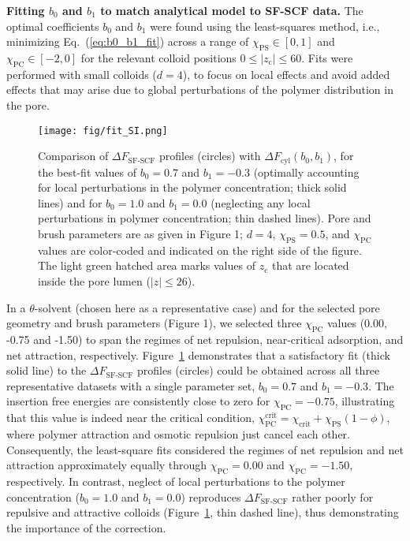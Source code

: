 \documentclass[10pt, a4paper, twocolumn]{article}
\begin{document}
\bigskip\noindent
\textbf{Fitting $b_0$ and $b_1$ to match analytical model to SF-SCF data.}
The optimal coefficients $b_0$ and $b_1$ were found using the least-squares method, i.e., minimizing Eq.~(\ref{eq:b0_b1_fit}) across a range of $\chi_{\text{PS}} \in [0,1]$  and $\chi_{\text{PC}} \in [-2,0]$ for the relevant colloid positions $0 \leq |z_{\text{c}}| \leq 60$.
Fits were performed with small colloids ($d=4$), to focus on local effects and avoid added effects that may arise due to global perturbations of the polymer distribution in the pore.

\begin{figure}[]
    \centering
    \texttt{[image: fig/fit\_SI.png]}
    \caption{
    Comparison of $\Delta F_{\text{SF-SCF}}$ profiles (circles) with $\Delta F_{\text{cyl}}(b_0,b_1)$, for the best-fit values of $b_0 = 0.7$ and $b_1 = -0.3$ (optimally accounting for local perturbations in the polymer concentration; thick solid lines) and for $b_0 = 1.0$ and $b_1 = 0.0$ (neglecting any local perturbations in polymer concentration; thin dashed lines).
    Pore and brush parameters are as given in Figure 1; $d = 4$, $\chi_{\text{PS}} = 0.5$, and $\chi_{\text{PC}}$ values are color-coded and indicated on the right side of the figure.
    The light green hatched area marks values of $z_{\text{c}}$ that are located inside the pore lumen ($|z| \leq 26$).
    }
    \label{fig:fit_SI}
\end{figure}

In a $\theta$-solvent (chosen here as a representative case) and for the selected pore geometry and brush parameters (Figure 1), we selected three $\chi_{\text{PC}}$ values (0.00, -0.75 and -1.50) to span the regimes of net repulsion, near-critical adsorption, and net attraction, respectively.
Figure~\ref{fig:fit_SI} demonstrates that a satisfactory fit (thick solid line) to the $\Delta F_{\text{SF-SCF}}$ profiles (circles) could be obtained across all three representative datasets with a single parameter set, $b_0 = 0.7$ and $b_1 = -0.3$.
The insertion free energies are consistently close to zero for $\chi_{\text{PC}} = -0.75$, illustrating that this value is indeed near the critical condition, $\chi_{\text{PC}}^{\text{crit}} = \chi_{\text{crit}} + \chi_{\text{PS}} (1 - \phi)$, where polymer attraction and osmotic repulsion just cancel each other.
Consequently, the least-square fits considered the regimes of net repulsion and net attraction approximately equally through $\chi_{\text{PC}} = 0.00$ and $\chi_{\text{PC}} = -1.50$, respectively.
In contrast, neglect of local perturbations to the polymer concentration ($b_0 = 1.0$ and $b_1 = 0.0$) reproduces $\Delta F_{\text{SF-SCF}}$ rather poorly for repulsive and attractive colloids (Figure~\ref{fig:fit_SI}, thin dashed line), thus demonstrating the importance of the correction.
\end{document}
